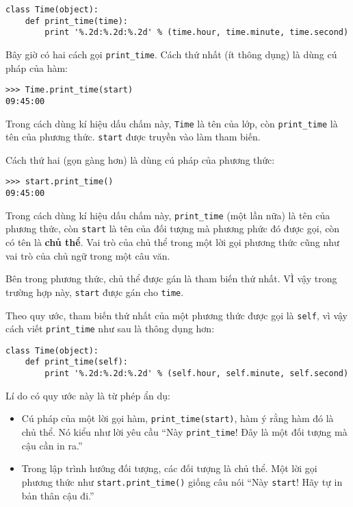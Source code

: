 \documentclass[11pt]{book}
\begin{document}

\beforeverb
\begin{verbatim}
class Time(object):
    def print_time(time):
        print '%.2d:%.2d:%.2d' % (time.hour, time.minute, time.second)
\end{verbatim}
\afterverb
%
Bây giờ có hai cách gọi \verb"print_time".  Cách thứ nhất (ít thông dụng)
là dùng cú pháp của hàm:


\beforeverb
\begin{verbatim}
>>> Time.print_time(start)
09:45:00
\end{verbatim}
\afterverb
%
Trong cách dùng kí hiệu dấu chấm này, {\tt Time} là tên của lớp, còn
\verb"print_time" là tên của phương thức.  {\tt start} được truyền vào
làm tham biến.

Cách thứ hai (gọn gàng hơn) là dùng cú pháp của phương thức:


\beforeverb
\begin{verbatim}
>>> start.print_time()
09:45:00
\end{verbatim}
\afterverb
%
Trong cách dùng kí hiệu dấu chấm này,  \verb"print_time" (một lần nữa)
là tên của phương thức, còn {\tt start} là tên của đối tượng
mà phương phức đó được gọi, còn có tên là {\bf chủ thể}.  Vai trò của 
chủ thể trong một lời gọi phương thức cũng như vai trò của chủ ngữ 
trong một câu văn.


Bên trong phương thức, chủ thể được gán là tham biến thứ nhất. VÌ vậy
trong trường hợp này,  {\tt start} được gán cho {\tt time}.


Theo quy ước, tham biến thứ nhất của một phương thức được gọi là
{\tt self}, vì vậy cách viết \verb"print_time" như sau là thông dụng hơn:

\beforeverb
\begin{verbatim}
class Time(object):
    def print_time(self):
        print '%.2d:%.2d:%.2d' % (self.hour, self.minute, self.second)
\end{verbatim}
\afterverb
%
Lí do có quy ước này là từ phép ẩn dụ:


\begin{itemize}

\item Cú pháp của một lời gọi hàm, \verb"print_time(start)",
  hàm ý rằng hàm đó là chủ thể. Nó kiểu như lời yêu cầu 
  ``Này \verb"print_time"!  Đây là một đối tượng mà cậu cần in ra.''

\item Trong lập trình hướng đối tượng, các đối tượng là chủ thể.
  Một lời gọi phương thức như \verb"start.print_time()" giống câu nói
  ``Này {\tt start}!  Hãy tự in bản thân cậu đi.''

\end{itemize}
\end{document}
